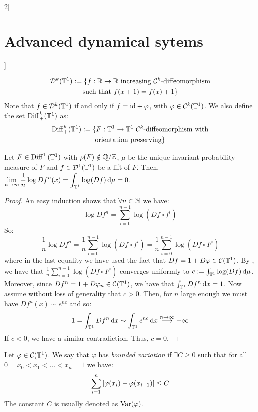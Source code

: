 \documentclass[../../../main_math.tex]{subfiles}
\begin{document}
\begin{multicols}{2}[\section{Advanced dynamical sytems}]
\begin{definition}
    \begin{multline*}
      \mathcal{D}^k(\mathbb{T}^1):=\{f:\mathbb{R}\to\mathbb{R} \text{ increasing $\mathcal{C}^k$-diffeomorphism}\\\text{such that }f(x+1)=f(x)+1\}
    \end{multline*}
    Note that $f\in \mathcal{D}^k(\mathbb{T}^1)$ if and only if $f=\mathrm{id} +\varphi$, with $\varphi\in\mathcal{C}^k(\mathbb{T}^1)$.
    We also define the set $\mathrm{Diff}_+^k(\mathbb{T}^1)$ as:
    \begin{multline*}
      \mathrm{Diff}_+^k(\mathbb{T}^1):=\{F:\mathbb{T}^1\to\mathbb{T}^1 \text{ $\mathcal{C}^k$-diffeomorphism with}\\\text{orientation preserving}\}
    \end{multline*}
  \end{definition}
  \begin{proposition}
    Let $F\in\mathrm{Diff}_+^1(\mathbb{T}^1)$ with $\rho(F)\notin\quot{\QQ}{\ZZ}$, $\mu$ be the unique invariant probability measure of $F$ and $f\in\mathcal{D}^1(\mathbb{T}^1)$ be a lift of $F$. Then, $\displaystyle \lim_{n\to \infty}\frac{1}{n}\log Df^n(x)=\int_{\mathbb{T}^1}\log(Df)\dd{\mu}=0$.
  \end{proposition}
  \begin{proof}
    An easy induction shows that $\forall n\in\mathbb{N}$ we have:
    $$
      \log Df^n=\sum_{i=0}^{n-1}\log(Df\circ f^i)
    $$
    So:
    $$
      \frac{1}{n}\log Df^n=\frac{1}{n}\sum_{i=0}^{n-1}\log(Df\circ f^i)=\frac{1}{n}\sum_{i=0}^{n-1}\log(Df\circ F^i)
    $$
    where in the last equality we have used the fact that $Df=1+D\varphi\in \mathcal{C}(\mathbb{T}^1)$. By , we have that $\frac{1}{n}\sum_{i=0}^{n-1}\log(Df\circ F^i)$ converges uniformly to $c:=\int_{\mathbb{T}^1}\log(Df)\dd{\mu}$. Moreover, since $Df^n=1+D\varphi_n\in \mathcal{C}(\mathbb{T}^1)$, we have that $\int_{\mathbb{T}^1}Df^n\dd{x} =1$. Now assume without loss of generality that $c>0$. Then, for $n$ large enough we must have $Df^n(x)\sim e^{nc}$ and so:
    $$
      1=\int_{\mathbb{T}^1}Df^n\dd{x}\sim \int_{\mathbb{T}^1}e^{nc}\dd{x}\overset{n\to\infty}{\longrightarrow} +\infty
    $$
    If $c<0$, we have a similar contradiction. Thus, $c=0$.
  \end{proof}
  \begin{definition}
    Let $\varphi\in\mathcal{C}(\mathbb{T}^1)$. We say that $\varphi$ has \emph{bounded variation} if $\exists C\geq 0$ such that for all $0=x_0<x_1<\dots<x_n=1$ we have:
    $$
      \sum_{i=1}^n\abs{\varphi(x_i)-\varphi(x_{i-1})}\leq C
    $$
    The constant $C$ is usually denoted as $\mathrm{Var}(\varphi)$.
  \end{definition}

\end{multicols}
\end{document}
